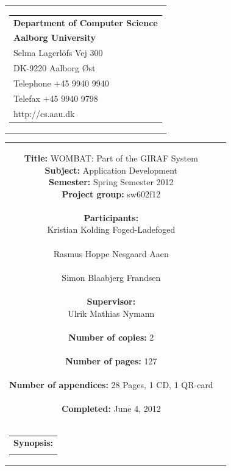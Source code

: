 \begin{nopagebreak}
\samepage 
\begin{tabular}{r}
\parbox{\textwidth}{
\hfill \parbox{4.7cm}{\begin{tabular}{l}
{\textsf\small \textbf{Department of Computer Science }}\\
{\textsf\small  \textbf{Aalborg University}}\\
{\textsf\small Selma Lagerlöfs Vej 300}\\
{\textsf\small DK-9220 Aalborg Øst}\\
{\textsf\small Telephone +45 9940 9940}\\
{\textsf\small Telefax +45 9940 9798}\\
{\textsf\small http://cs.aau.dk}
\end{tabular}}}
\end{tabular}

\begin{tabular}{cc}
\parbox{7cm}{
\textbf{Title:} 
WOMBAT: Part of the GIRAF System\\
\textbf{Subject:} 
Application Development\\
\textbf{Semester:} Spring Semester 2012\\
\textbf{Project group:} sw602f12\\ \\
\textbf{Participants:} \\
Kristian Kolding Foged-Ladefoged \\ \\
Rasmus Hoppe Nesgaard Aaen \\ \\
Simon Blaabjerg Frandsen \\ \\
\textbf{Supervisor:} \\
Ulrik Mathias Nymann\\ \\
\textbf{Number of copies:}
2 \\ \\
\textbf{Number of pages:}
127 \\ \\
\textbf{Number of appendices:}
28 Pages, 1 CD, 1 QR-card\\ \\
\textbf{Completed:}
June 4, 2012 \\ \\
}

\parbox{7cm}{
\vspace{.15cm}
\hfill 
\begin{tabular}{l}
\textbf{Synopsis:} \\
\fbox{
\parbox{6.5cm}{
{\vfill{\small {}\bigskip}}
}}
\end{tabular}}
\end{tabular}


\end{nopagebreak}
